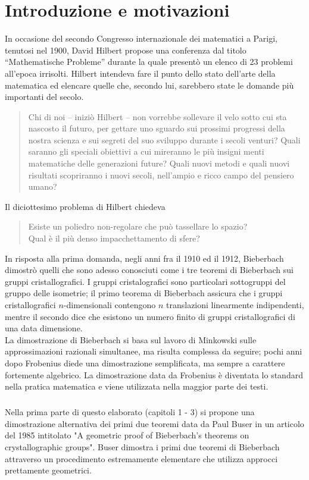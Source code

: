 \documentclass[a4paper,11pt,openright,twoside	]{book}
\author{Elisa Caruso}
\begin{document}
 

\chapter*{Introduzione e motivazioni}

In occasione del secondo Congresso internazionale dei matematici a Parigi, tenutosi nel 1900,  David Hilbert propose una conferenza dal titolo “Mathematische Probleme” durante la quale presentò un elenco di 23 problemi all'epoca irrisolti. Hilbert intendeva fare il punto dello stato dell'arte della matematica ed elencare quelle che, secondo lui, sarebbero state le domande più importanti del secolo. \begin{quote}
Chi di noi – iniziò Hilbert – non vorrebbe sollevare il velo sotto cui sta nascosto il futuro, per gettare uno sguardo sui prossimi progressi della nostra scienza e sui segreti del suo sviluppo durante i secoli venturi? Quali saranno gli speciali obiettivi a cui mireranno le più insigni menti matematiche delle generazioni future? Quali nuovi metodi e quali nuovi risultati scopriranno i nuovi secoli, nell’ampio e ricco campo del pensiero umano?
\end{quote}
Il diciottesimo problema di Hilbert chiedeva
\begin{quote}
Esiste un poliedro non-regolare che può tassellare lo spazio? \\
Qual è il più denso impacchettamento di sfere?	
\end{quote}
In risposta alla prima domanda, negli anni fra il 1910 ed il 1912, Bieberbach dimostrò quelli che sono adesso conosciuti come i tre teoremi di Bieberbach sui gruppi cristallografici. I gruppi cristalografici sono particolari sottogruppi del gruppo delle isometrie; il primo teorema di Bieberbach assicura che i gruppi cristallografici $n$-dimensionali contengono $n$ translazioni linearmente indipendenti, mentre il secondo dice che esistono un numero finito di gruppi cristallografici di una data dimensione. \\
La dimostrazione di Bieberbach si basa sul lavoro di Minkowski sulle approssimazioni razionali simultanee, ma risulta complessa da seguire; pochi anni dopo Frobenius diede una dimostrazione semplificata, ma sempre a carattere fortemente algebrico. La dimostrazione data da Frobenius è diventata lo standard nella pratica matematica e viene utilizzata nella maggior parte dei testi.
\paragraph{}
Nella prima parte di questo elaborato (capitoli 1 - 3) si propone una dimostrazione alternativa dei primi due teoremi data da Paul Buser in un articolo del 1985 intitolato "A geometric proof of Bieberbach's theorems on crystallographic groups". Buser dimostra i primi due teoremi di Bieberbach attraverso un procedimento estremamente elementare che utilizza approcci prettamente geometrici.
\end{document}
